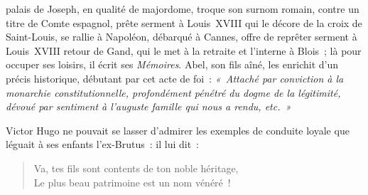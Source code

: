 \documentclass[french,twoside]{book} %
\begin{document}
\label{p19}palais de Joseph, en qualité de majordome, troque son surnom romain, contre un titre de Comte espagnol, prête serment à Louis XVIII qui le décore de la croix de Saint-Louis, se rallie à Napoléon, débarqué à Cannes, offre de reprêter serment à Louis XVIII retour de Gand, qui le met à la retraite et l’interne à Blois ; là pour occuper ses loisirs, il écrit ses \emph{Mémoires}. Abel, son fils aîné, les enrichit d’un précis historique, débutant par cet acte de foi : \emph{« Attaché par conviction à la monarchie constitutionnelle, profondément pénétré du dogme de la légitimité, dévoué par sentiment à l’auguste famille qui nous a rendu, etc. »}\par
Victor Hugo ne pouvait se lasser d’admirer les exemples de conduite loyale que léguait à ses enfants l’ex-Brutus : il lui dit :\par


\begin{verse}
Va, tes fils sont contents de ton noble héritage,\\
Le plus beau patrimoine est un nom vénéré !\\
\end{verse}
\end{document}
